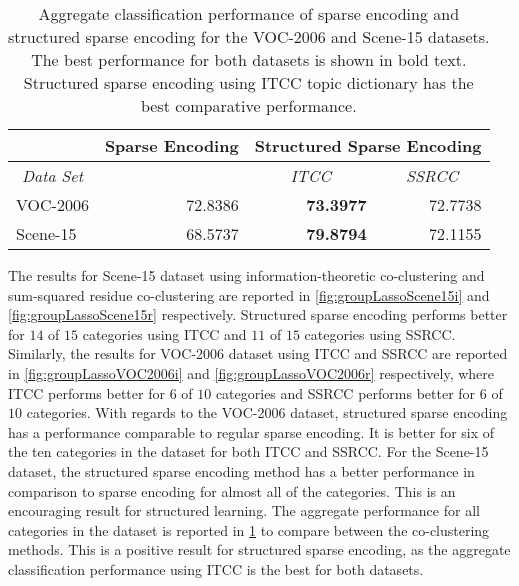 \begin{table}[htbp]
\centering
\renewcommand{\arraystretch}{1.6}
\begin{tabular}{|l|r|c|r|}
\hline
 & \multicolumn{1}{c|}{Sparse Encoding} & \multicolumn{ 2}{c|}{Structured Sparse Encoding} \\ \hline
\multicolumn{1}{|c|}{\textit{Data Set}} & \multicolumn{1}{l|}{} & \textit{ITCC} & \multicolumn{1}{c|}{\textit{SSRCC}} \\ \hline
VOC-2006 & 72.8386 & \multicolumn{1}{r|}{\textbf{73.3977}} & 72.7738 \\ \hline
Scene-15 & 68.5737 & \multicolumn{1}{r|}{\textbf{79.8794}} & 72.1155 \\ \hline
\end{tabular}
\caption[Aggregate classification performance of sparse encoding and structured sparse encoding for the VOC-2006 and Scene-15 datasets]{Aggregate classification performance of sparse encoding and structured sparse encoding for the VOC-2006 and Scene-15 datasets. The best performance for both datasets is shown in bold text. Structured sparse encoding using ITCC topic dictionary has the best comparative performance.}
\label{tab:structsparseencoding}
\end{table}

The results for Scene-15 dataset using information-theoretic co-clustering and sum-squared residue co-clustering are reported in \cref{fig:groupLassoScene15i} and \cref{fig:groupLassoScene15r} respectively. Structured sparse encoding performs better for $14$ of $15$ categories using ITCC and $11$ of $15$ categories using SSRCC. Similarly, the results for VOC-2006 dataset using ITCC and SSRCC are reported in \cref{fig:groupLassoVOC2006i} and \cref{fig:groupLassoVOC2006r} respectively, where ITCC performs better for $6$ of $10$ categories and SSRCC performs better for $6$ of $10$ categories.  With regards to the VOC-2006 dataset, structured sparse encoding has a performance comparable to regular sparse encoding. It is better for six of the ten categories in the dataset for both ITCC and SSRCC. For the Scene-15 dataset, the structured sparse encoding method has a better performance in comparison to sparse encoding for almost all of the categories. This is an encouraging result for structured learning. The aggregate performance for all categories in the dataset is reported in \cref{tab:structsparseencoding} to compare between the co-clustering methods. This is a positive result for structured sparse encoding, as the aggregate classification performance using ITCC is the best for both datasets.

